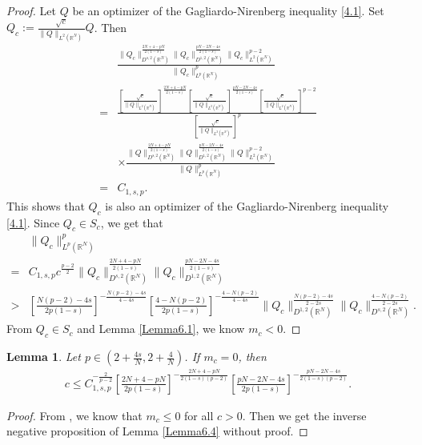 \documentclass[12pt,a4paper,reqno]{amsart}
\numberwithin{equation}{section}
\newtheorem{lemma}{Lemma}[section]
\begin{document}
\begin{proof}
Let $Q$ be an optimizer of the Gagliardo-Nirenberg inequality \eqref{4.1}.
Set $Q_{c}:=\frac{\sqrt{c}}{\|Q\|_{L^{2}(\mathbb{R}^{N})}}Q$.
Then
\begin{equation*}
\begin{aligned}
&\frac{
\|Q_{c}\|_{D^{s,2}(\mathbb{R}^{N})}^{\frac{2N+4-pN}{2(1-s)}}
\|Q_{c}\|_{D^{1,2}(\mathbb{R}^{N})}^{\frac{pN-2N-4s}{2(1-s)}}
\|Q_{c}\|_{L^{2}(\mathbb{R}^{N})}^{p-2}
}
{\|Q_{c}\|_{L^{p}(\mathbb{R}^{N})}^{p}}\\
=&
\frac{
\left[\frac{\sqrt{c}}{\|Q\|_{L^{2}(\mathbb{R}^{N})}}\right]^{\frac{2N+4-pN}{2(1-s)}}
\left[\frac{\sqrt{c}}{\|Q\|_{L^{2}(\mathbb{R}^{N})}}\right]^{\frac{pN-2N-4s}{2(1-s)}}
\left[\frac{\sqrt{c}}{\|Q\|_{L^{2}(\mathbb{R}^{N})}}\right]^{p-2}
}
{\left[\frac{\sqrt{c}}{\|Q\|_{L^{2}(\mathbb{R}^{N})}}\right]^{p}}\\
&\times
\frac{
\|Q\|_{D^{s,2}(\mathbb{R}^{N})}^{\frac{2N+4-pN}{2(1-s)}}
\|Q\|_{D^{1,2}(\mathbb{R}^{N})}^{\frac{pN-2N-4s}{2(1-s)}}
\|Q\|_{L^{2}(\mathbb{R}^{N})}^{p-2}
}
{\|Q\|_{L^{p}(\mathbb{R}^{N})}^{p}}\\
=&
C_{1,s,p}.
\end{aligned}
\end{equation*}
This shows that $Q_{c}$ is also an optimizer of the Gagliardo-Nirenberg inequality \eqref{4.1}.
Since $Q_{c}\in S_{c}$,
we get that
\begin{equation*}
\begin{aligned}
&\|Q_{c}\|_{L^{p}(\mathbb{R}^{N})}^{p}\\
=&C_{1,s,p}
c^{\frac{p-2}{2}}
\|Q_{c}\|_{D^{s,2}(\mathbb{R}^{N})}^{\frac{2N+4-pN}{2(1-s)}}
\|Q_{c}\|_{D^{1,2}(\mathbb{R}^{N})}^{\frac{pN-2N-4s}{2(1-s)}}\\
>&
\left[
\frac{N(p-2)-4s}{2p(1-s)}
\right]^{-\frac{N(p-2)-4s}{4-4s}}
\left[
\frac{4-N(p-2)}{2p(1-s)}
\right]^{-\frac{4-N(p-2)}{4-4s}}
\|Q_{c}\|_{D^{1,2}(\mathbb{R}^{N})}^{\frac{N(p-2)-4s}{2-2s}}
\|Q_{c}\|_{D^{s,2}(\mathbb{R}^{N})}^{\frac{4-N(p-2)}{2-2s}}.
\end{aligned}
\end{equation*}
From $Q_{c}\in S_{c}$ and Lemma \ref{Lemma6.1}, we know $m_{c}<0$.
\end{proof}

\begin{lemma}\label{Lemma6.5}
Let $p\in(2+\frac{4s}{N},2+\frac{4}{N})$.
If $m_{c}=0$,
then
\begin{equation*}
\begin{aligned}
c\leqslant C_{1,s,p}^{-\frac{2}{p-2}}
\left[
\frac{2N+4-pN}{2p(1-s)}
\right]^{-\frac{2N+4-pN}{2(1-s)(p-2)}}
\left[
\frac{pN-2N-4s}{2p(1-s)}
\right]^{-\frac{pN-2N-4s}{2(1-s)(p-2)}}.
\end{aligned}
\end{equation*}
\end{lemma}
\begin{proof}
From \cite[Theorem 1.1 (4)]{LuoTJ-Hajaiej2022ANS}, we know that $m_{c}\leqslant0$ for all $c>0$. Then we get the inverse negative proposition of Lemma \ref{Lemma6.4} without proof.
\end{proof}
\end{document}
